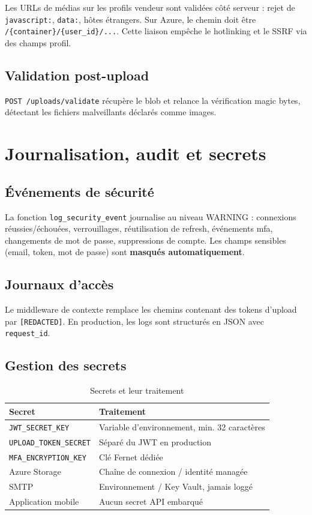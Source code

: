 Les URLs de médias sur les profils vendeur sont validées côté serveur : rejet de \texttt{javascript:}, \texttt{data:}, hôtes étrangers. Sur Azure, le chemin doit être \texttt{/\{container\}/\{user\_id\}/...}. Cette liaison empêche le hotlinking et le SSRF via des champs profil.

\subsection{Validation post-upload}

\texttt{POST /uploads/validate} récupère le blob et relance la vérification magic bytes, détectant les fichiers malveillants déclarés comme images.

\section{Journalisation, audit et secrets}

\subsection{Événements de sécurité}

La fonction \texttt{log\_security\_event} journalise au niveau WARNING : connexions réussies/échouées, verrouillages, réutilisation de refresh, événements \gls{mfa}, changements de mot de passe, suppressions de compte. Les champs sensibles (email, token, mot de passe) sont \textbf{masqués automatiquement}.

\subsection{Journaux d'accès}

Le middleware de contexte remplace les chemins contenant des tokens d'upload par \texttt{[REDACTED]}. En production, les logs sont structurés en JSON avec \texttt{request\_id}.

\subsection{Gestion des secrets}

\begin{table}[H]
  \centering
  \caption{Secrets et leur traitement}
  \label{tab:secrets}
  \begin{tabularx}{\textwidth}{@{}lX@{}}
    \toprule
    \textbf{Secret} & \textbf{Traitement} \\
    \midrule
    \texttt{JWT\_SECRET\_KEY} & Variable d'environnement, min. 32 caractères \\
    \texttt{UPLOAD\_TOKEN\_SECRET} & Séparé du JWT en production \\
    \texttt{MFA\_ENCRYPTION\_KEY} & Clé Fernet dédiée \\
    Azure Storage & Chaîne de connexion / identité managée \\
    SMTP & Environnement / Key Vault, jamais loggé \\
    Application mobile & Aucun secret API embarqué \\
    \bottomrule
  \end{tabularx}
\end{table}

